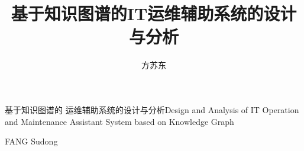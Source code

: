 \title{基于知识图谱的IT运维辅助系统的设计与分析}{基于知识图谱的  运维辅助系统的设计与分析}{}{}{Design and Analysis of IT Operation and Maintenance Assistant System based on Knowledge Graph}{}
\author{方苏东}{FANG Sudong}
\authorizedate{\today}
\committeechair{}
\reviewer{}{}
\makecover
